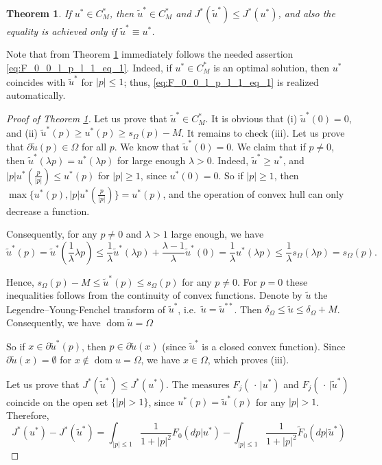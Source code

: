 \documentclass[14pt]{extarticle}
\renewcommand{\le}{\leqslant}
\renewcommand{\ge}{\geqslant}
\DeclareMathOperator{\dom}{\mathrm{dom}}
\newtheorem{thm}{Theorem}
\theoremstyle{remark}
\theoremstyle{definition}
\begin{document}
\begin{thm}
\label{thm:grad_ge_1}
	If $u^*\in C_M^*$, then $\tilde u^*\in C_M^*$ and $J^*(\tilde u^*)\le J^*(u^*)$, and also the equality is achieved only if $\tilde u^*\equiv u^*$.
\end{thm}

Note that from Theorem \ref{thm:grad_ge_1} immediately follows the needed assertion \eqref{eq:F_0_0_l_p_l_1_eq_1}. Indeed, if $u^*\in C_M^*$  is an optimal solution, then $u^*$ coincides with $\tilde u^*$ for $|p|\le 1$; thus, \eqref{eq:F_0_0_l_p_l_1_eq_1} is realized automatically.

\medskip

\begin{proof}[Proof of Theorem \ref{thm:grad_ge_1}]
	Let us prove that $\tilde u^*\in C_M^*$. It is obvious that (i) $\tilde u^*(0)=0$, and (ii) $\tilde u^*(p)\ge u^*(p)\ge s_\Omega(p)-M$. It remains to check (iii). Let us prove that $\partial \tilde u(p)\in\Omega$ for all $p$. We know that $\tilde u^*(0)=0$. We claim that if $p\ne 0$, then $\tilde u^*(\lambda p)=u^*(\lambda p)$ for large enough $\lambda>0$. Indeed, $\tilde u^*\ge u^*$, and $|p|u^*(\frac{p}{|p|})\le u^*(p)$ for $|p|\ge 1$, since $u^*(0)=0$. So if $|p|\ge 1$, then $\max\{u^*(p),|p|u^*(\frac{p}{|p|})\}=u^*(p)$, and the operation of convex hull can only decrease a function. 

	\medskip
	
	Consequently, for any $p\ne 0$ and $\lambda>1$ large enough, we have
	\[
		\tilde u^*(p) = \tilde u^*(\frac1\lambda\lambda p) \le
			\frac1\lambda \tilde u^*(\lambda p) + 
			\frac{\lambda-1}{\lambda}\tilde u^*(0) = \frac1\lambda u^*(\lambda p) \le \frac1\lambda s_\Omega(\lambda p) = s_\Omega(p).
	\]
	
	\noindent Hence, $s_\Omega(p)-M \le \tilde u^*(p)\le s_\Omega(p)$ for any $p\ne 0$. For $p=0$ these inequalities follows from the continuity of convex functions. Denote by $\tilde u$ the Legendre--Young-Fenchel transform of $\tilde u^*$, i.e.\ $\tilde u=\tilde u^{**}$. Then $\delta_\Omega\le \tilde u\le\delta_\Omega+M$. Consequently, we have $\dom \tilde u=\Omega$
	
	So if $x\in\partial\tilde u^*(p)$, then $p\in\partial\tilde u(x)$ (since $\tilde u^*$ is a closed convex function). Since $\partial \tilde u(x)=\emptyset$ for $x\not\in\dom u=\Omega$, we have $x\in\Omega$, which proves (iii).
	
	Let us prove that $J^*(\tilde u^*)\le J^*(u^*)$. The measures $F_j(\,\cdot\,|u^*)$ and $F_j(\,\cdot\,|\tilde u^*)$ coincide on the open set $\{|p|>1\}$, since $u^*(p)=\tilde u^*(p)$ for any $|p|>1$. Therefore,
	\[
		J^*(u^*) - J^*(\tilde u^*) = 
		\int_{|p|\le 1} \frac{1}{1+|p|^2}F_0(dp|u^*) - \int_{|p|\le 1} \frac{1}{1+|p|^2}\tilde F_0(dp|\tilde u^*)
	\]
	

\end{proof}
\end{document}
